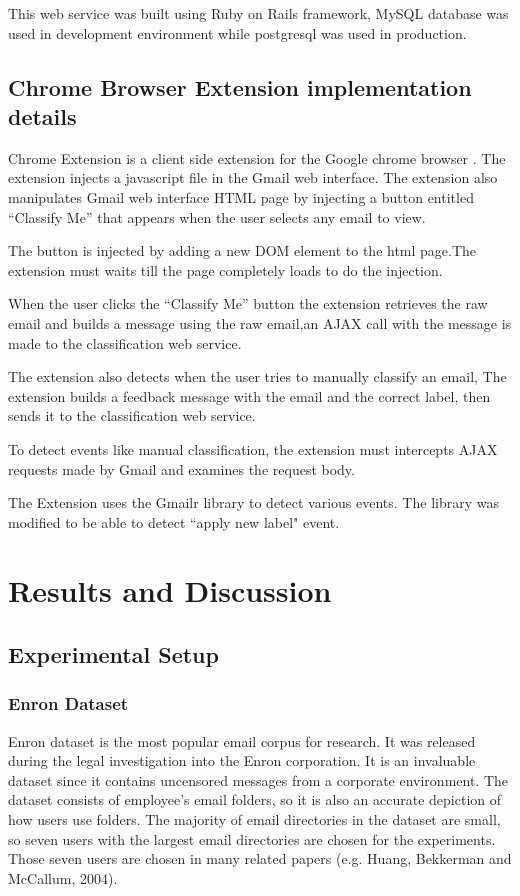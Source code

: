     This web service was built using Ruby on Rails \cite{ROR} framework, MySQL database was used
    in development environment while postgresql was used in production.


\subsection{Chrome Browser Extension implementation details}
    Chrome Extension is a client side extension for the Google chrome browser \cite{CHROME}.
    The extension injects a javascript file in the Gmail web interface. The extension also manipulates
    Gmail web interface HTML page by injecting a button entitled ``Classify Me''
    that appears when the user selects any email to view.

    The button is injected by adding a new DOM element to the html page.The extension must waits till
    the page completely loads to do the injection.

    When the user clicks the ``Classify Me'' button the extension retrieves the raw email and
    builds a message using the raw email,an AJAX call with the message is made to the 
    classification web service.

    The extension also detects when the user tries to manually classify an email, The extension builds
    a feedback message with the email and the correct label, then sends it to the classification 
    web service.

    To detect events like manual classification, the extension must intercepts AJAX requests made by
    Gmail and examines the request body.

    The Extension uses the Gmailr library \cite{GMAILR} to detect various events. The library was modified 
    to be able to detect ``apply new label" event.

\section{Results and Discussion}
\label{sec:6_results_discussion}
\subsection{Experimental Setup}

\subsubsection{Enron Dataset \cite{ENRON}}
Enron dataset is the most popular email corpus for research. It was released 
during the legal investigation into the Enron corporation.
It is an invaluable dataset since it contains uncensored messages from a 
corporate environment. The dataset consists of employee's email folders, 
so it is also an accurate depiction of how users use folders. The majority 
of email directories in the dataset are small, so seven users with the largest 
email directories are chosen for the experiments. Those seven users are chosen 
in many related papers (e.g. Huang, Bekkerman and McCallum, 2004\cite{RON04}).

